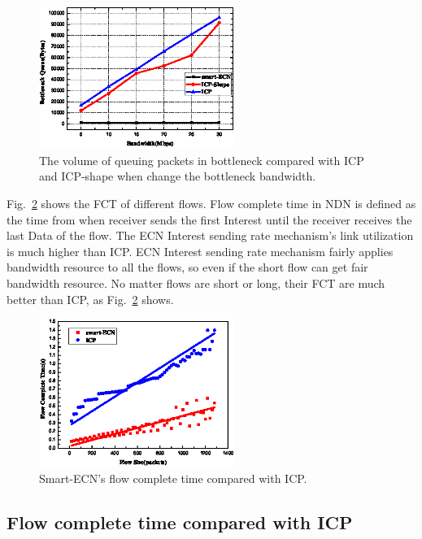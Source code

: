 \begin{figure}[t]
	\centering
	\includegraphics[width=2.5in]{queu-pic-cut.eps}
	\caption{The volume of queuing packets in bottleneck compared with ICP and ICP-shape when change the bottleneck bandwidth.}
	\label{fig-queue}
\end{figure}

Fig.~\ref{fig-fct} shows the FCT of different flows. Flow complete time in NDN is defined as the time from when receiver sends the first Interest until the receiver receives the last Data of the flow. The ECN Interest sending rate mechanism's link utilization is much higher than ICP. ECN Interest sending rate mechanism fairly applies bandwidth resource to all the flows, so even if the short flow can get fair bandwidth resource. No matter flows are short or long, their FCT are much better than ICP, as Fig.~\ref{fig-fct} shows.

\begin{figure}[t]
	\centering
	\includegraphics[width=2.5in]{fct-cut.eps}
	\caption{Smart-ECN's flow complete time compared with ICP.}
	\label{fig-fct}
\end{figure}

\subsection{Flow complete time compared with ICP}


